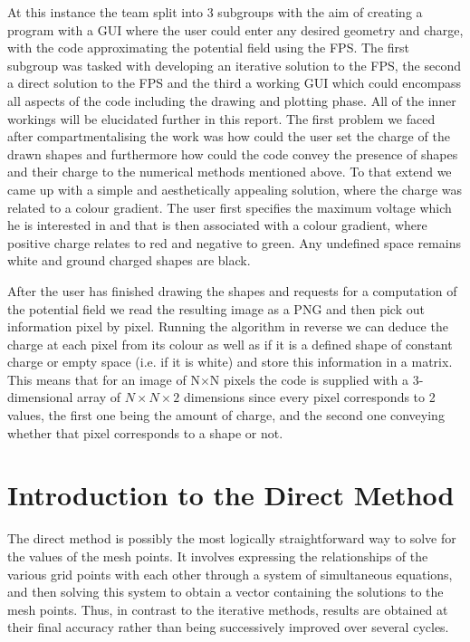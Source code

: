 \documentclass[a4paper]{article}
\begin{document}
At this instance the team split into 3 subgroups with the aim of creating a 
program with a GUI where the user could enter any desired geometry and charge, 
with the code approximating the potential field using the FPS. The first 
subgroup was tasked with developing an iterative solution to the FPS, the 
second a direct solution to the FPS and the third a working GUI which could 
encompass all aspects of the code including the drawing and plotting phase. 
All of the inner workings will be elucidated further in this report.
The first problem we faced after compartmentalising the work was how could the 
user set the charge of the drawn shapes and furthermore how could the code 
convey the presence of shapes and their charge to the numerical methods 
mentioned above. To that extend we came up with a simple and aesthetically 
appealing solution, where the charge was related to a colour gradient. The user 
first specifies the maximum voltage which he is interested in and that is then 
associated with a colour gradient, where positive charge relates to red and 
negative to green. Any undefined space remains white and ground charged shapes 
are black.

After the user has finished drawing the shapes and requests for a computation 
of the potential field we read the resulting image as a PNG and then pick out 
information pixel by pixel. Running the algorithm in reverse we can deduce the 
charge at each pixel from its colour as well as if it is a defined shape of 
constant charge or empty space (i.e. if it is white) and store this information 
in a matrix. This means that for an image of N$\times$N pixels the code is
supplied with a 3-dimensional array of $N\times N \times 2$ dimensions since
every pixel corresponds to 2 values, the first one being the amount of charge,
and the second one conveying whether that pixel corresponds to a shape or
not.  


\section{Introduction to the Direct Method}
The direct method is possibly the most logically straightforward way to solve
for the values of the mesh points. It involves expressing the relationships of
the various grid points with each other through a system of simultaneous
equations, and then solving this system to obtain a vector containing the
solutions to the mesh points. Thus, in contrast to the iterative methods,
results are obtained at their final accuracy rather than being successively
improved over several cycles.
\end{document}
